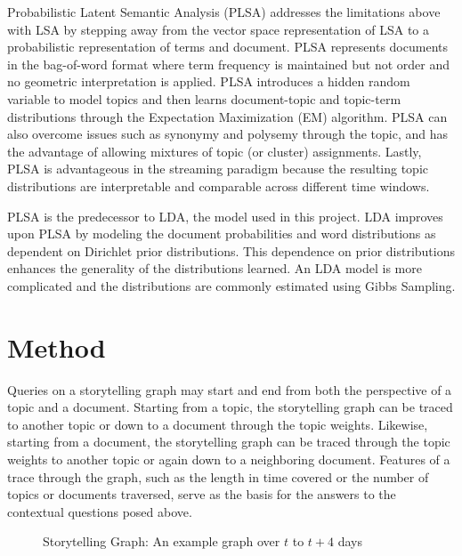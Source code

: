 \documentclass[10pt]{article}
\begin{document}
Probabilistic Latent Semantic Analysis (PLSA) addresses the limitations above with LSA by stepping away from the vector space representation of LSA to a probabilistic representation of terms and document.  PLSA represents documents in the bag-of-word format where term frequency is maintained but not order and no geometric interpretation is applied. PLSA introduces a hidden random variable to model topics and then learns document-topic and topic-term distributions through the Expectation Maximization (EM) algorithm.  PLSA can also overcome issues such as synonymy and polysemy through the topic, and has the advantage of allowing mixtures of topic (or cluster) assignments.  Lastly, PLSA is advantageous in the streaming paradigm because the resulting topic distributions are interpretable and comparable across different time windows. 

PLSA is the predecessor to LDA, the model used in this project.  LDA improves upon PLSA by modeling the document probabilities and word distributions as dependent on Dirichlet prior distributions.  This dependence on prior distributions enhances the generality of the distributions learned.  An LDA model is more complicated and the distributions are commonly estimated using Gibbs Sampling.

\section {Method}

Queries on a storytelling graph may start and end from both the perspective of a topic and a document.  Starting from a topic, the storytelling graph can be traced to another topic or down to a document through the topic weights.  Likewise, starting from a document, the storytelling graph can be traced through the topic weights to another topic or again down to a neighboring document.  Features of a trace through the graph, such as the length in time covered or the number of topics or documents traversed, serve as the basis for the answers to the contextual questions posed above.


\begin{figure}[htp] 
\caption{Storytelling Graph: An example graph over $t$ to $t+4$ days}
\end{figure}  
\end{document}
